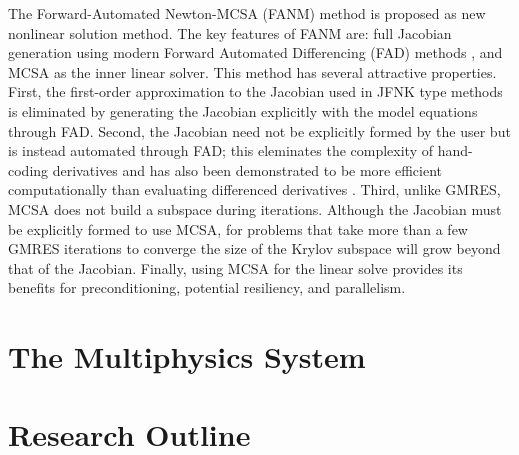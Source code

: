 The Forward-Automated Newton-MCSA (FANM) method is proposed as new
nonlinear solution method. The key features of FANM are: full Jacobian
generation using modern Forward Automated Differencing (FAD) methods
\citep{bartlett_2006}, and MCSA as the inner linear solver. This method
has several attractive properties. First, the first-order
approximation to the Jacobian used in JFNK type methods is eliminated
by generating the Jacobian explicitly with the model equations through
FAD. Second, the Jacobian need not be explicitly formed by the user
but is instead automated through FAD; this eleminates the complexity
of hand-coding derivatives and has also been demonstrated to be more
efficient computationally than evaluating differenced derivatives
\citep{bartlett_2006}. Third, unlike GMRES, MCSA does not build a
subspace during iterations. Although the Jacobian must be explicitly
formed to use MCSA, for problems that take more than a few GMRES
iterations to converge the size of the Krylov subspace will grow
beyond that of the Jacobian. Finally, using MCSA for the linear solve
provides its benefits for preconditioning, potential resiliency, and
parallelism.

\section{The Multiphysics System}
\label{sec:multiphysics_system}

\section{Research Outline}
\label{sec:research_outline}
